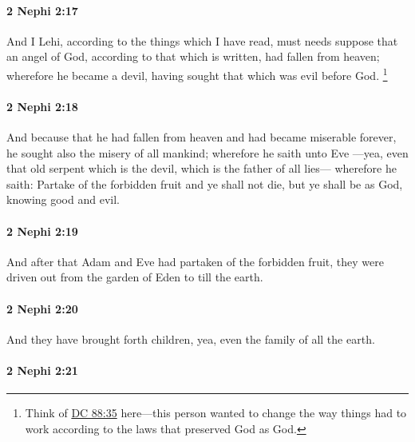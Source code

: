 		\paragraph{2 Nephi 2:17} %
			\label{2NEPHI-2-17}

			And I Lehi, according to the things which I have read,
			must needs suppose that an angel of God,
			according to that which is written,
			had fallen from heaven;
			wherefore he became a devil,
			having sought that which was evil before God.%
				\footnote{%
					\label{2NEPHI-2-17-sought}%
					Think of \hyperref[DC88-35]{DC 88:35} here---this person wanted to change the way things had to work according to the laws that preserved God as God.
					}

		\paragraph{2 Nephi 2:18} %
			\label{2NEPHI-2-18}

			And because that he had fallen from heaven
			and had became miserable forever,
			he sought also the misery of all mankind;
			wherefore he saith unto Eve
			---yea, even that old serpent which is the devil,
			which is the father of all lies---
			wherefore he saith:
			Partake of the forbidden fruit and ye shall not die,
			but ye shall be as God, knowing good and evil.

		\paragraph{2 Nephi 2:19} %
			\label{2NEPHI-2-19}

			And after that Adam and Eve had partaken of the forbidden fruit,
			they were driven out from the garden of Eden to till the earth.

		\paragraph{2 Nephi 2:20} %
			\label{2NEPHI-2-20}

			And they have brought forth children,
			yea, even the family of all the earth.

		\paragraph{2 Nephi 2:21} %
			\label{2NEPHI-2-21}


